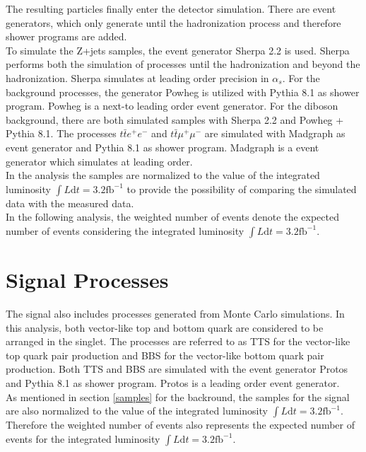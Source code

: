 The resulting particles finally enter the detector simulation.
There are event generators, which only generate until the hadronization process and therefore shower programs are added.\\
To simulate the Z+jets samples, the event generator Sherpa 2.2 is used.
Sherpa \cite{Sherpa} performs both the simulation of processes until the hadronization and beyond the hadronization.
Sherpa simulates at leading order precision in $\alpha_{s}$. 
For the \ttbar{} background processes, the generator Powheg is utilized with Pythia 8.1 \cite{Pythia} as shower program.
Powheg \cite{Powheg} is a next-to leading order event generator.
For the diboson background, there are both simulated samples with Sherpa 2.2 and Powheg + Pythia 8.1.
The processes $t \bar{t} e^{+}\!e^{-}$  and $t \bar{t} \mu^{+}\!\mu^{-}$ are simulated with Madgraph as event generator and Pythia 8.1 as shower program.
Madgraph \cite{Madgraph} is a event generator which simulates at leading order.\\
In the analysis the samples are normalized to the value of the integrated luminosity $\int{L} \mathrm{d}t = 3.2 \mathrm{fb}^{-1}$ to provide the possibility of comparing the simulated data with the measured data.\\
In the following analysis, the weighted number of events denote the expected number of events considering the integrated luminosity $\int{L} \mathrm{d}t = 3.2 \mathrm{fb}^{-1}$.


\section{Signal Processes}
The signal also includes processes generated from Monte Carlo simulations. 
In this analysis, both vector-like top and bottom quark are considered to be arranged in the singlet.
The processes are referred to as TTS for the vector-like top quark pair production and BBS for the vector-like bottom quark pair production.
Both TTS and BBS are simulated with the event generator Protos and Pythia 8.1 as shower program.
Protos \cite{Protos} is a leading order event generator.\\
As mentioned in section \ref{samples} for the backround, the samples for the signal are also normalized to the value of the integrated luminosity $\int{L} \mathrm{d}t = 3.2 \mathrm{fb}^{-1}$.
Therefore the weighted number of events also represents the expected number of events for the integrated luminosity $\int{L} \mathrm{d}t = 3.2 \mathrm{fb}^{-1}$.
